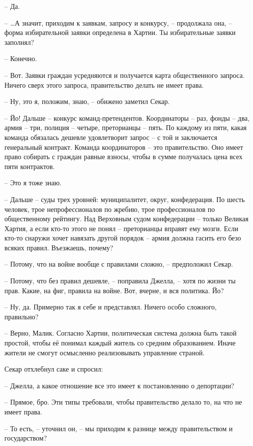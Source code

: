 -- Да.

-- \ldots{}А значит, приходим к заявкам, запросу и конкурсу, -- продолжала она, -- форма избирательной заявки определена в Хартии. Ты избирательные заявки заполнял?

-- Конечно.

-- Вот. Заявки граждан усредняются и получается карта общественного запроса. Ничего сверх этого запроса, правительство делать не имеет права.

-- Ну, это я, положим, знаю, -- обижено заметил Секар.

-- Йо! Дальше -- конкурс команд-претендентов. Координаторы -- раз, фонды -- два, армия -- три, полиция -- четыре, преторианцы -- пять. По каждому из пяти, какая команда обязалась дешевле удовлетворит запрос -- с той и заключается генеральный контракт. Команда координаторов -- это правительство. Оно имеет право собирать с граждан равные взносы, чтобы в сумме получалась цена всех пяти контрактов.

-- Это я тоже знаю.

-- Дальше -- суды трех уровней: муниципалитет, округ, конфедерация. По шесть человек, трое непрофессионалов по жребию, трое профессионалов по общественному рейтингу. Над Верховным судом конфедерации -- только Великая Хартия, а если кто-то этого не понял -- преторианцы вправят ему мозги. Если кто-то снаружи хочет навязать другой порядок -- армия должна гасить его безо всяких правил. Въезжаешь, почему?

-- Потому, что на войне вообще с правилами сложно, -- предположил Секар.

-- Потому, что без правил дешевле, -- поправила Джелла, -- хотя по жизни ты прав. Какие, на фиг, правила на войне. Вот, вчерне, и вся политика. Йо?

-- Ну, да. Примерно так я себе и представлял. Ничего особо сложного, правильно?

-- Верно, Малик. Согласно Хартии, политическая система должна быть такой простой, чтобы её понимал каждый житель со средним образованием. Иначе жители не смогут осмысленно реализовывать управление страной.

Секар отхлебнул саке и спросил:

-- Джелла, а какое отношение все это имеет к постановлению о депортации?

-- Прямое, бро. Эти типы требовали, чтобы правительство делало то, на что не имеет права.

-- То есть, -- уточнил он, -- мы приходим к разнице между правительством и государством?

